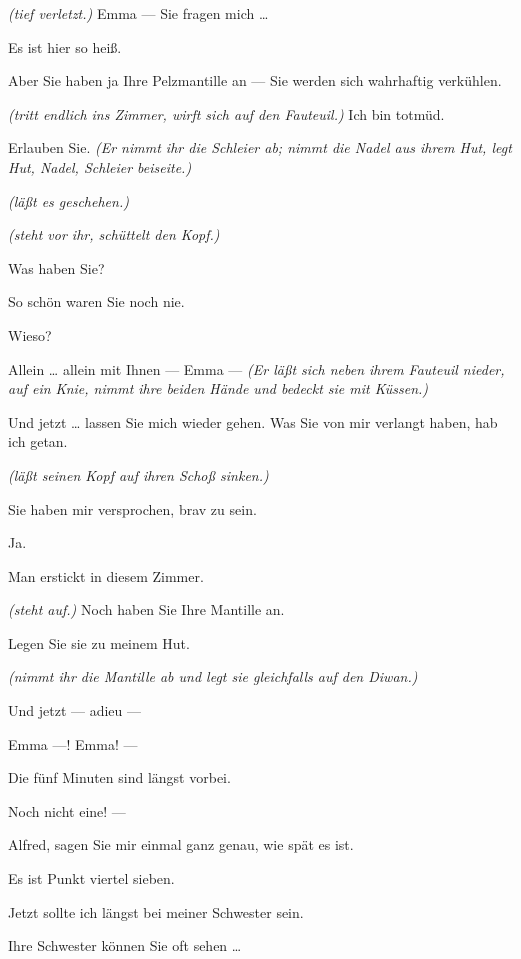 \documentclass[
	final,
	a4paper,
	ngerman,
	mpinclude = true, %
	twoside = true,
	open = right,
	cleardoublepage = plain,
	DIV = 13,
	BCOR = 1cm,
	titlepage = firstiscover,
	]{scrbook}
\newcommand{\direction}[1]{\textit{(#1)}}
\newcommand{\thecharacter}[1]{\textup{\textsc{#1}}\xspace}
\newcommand{\theherr}{\thecharacter{Junger Herr}}
\newcommand{\thefrau}{\thecharacter{Junge Frau}}
\newcommand{\character}[1]{\item[#1:]}
\newcommand{\herr}{\character{\theherr}}
\newcommand{\frau}{\character{\thefrau}}
\begin{document}
\begin{play}
	\herr
	\direction{tief verletzt.} Emma --- Sie fragen mich \ldots{}

	\frau
	Es ist hier so heiß.

	\herr
	Aber Sie haben ja Ihre Pelzmantille an --- Sie werden sich wahrhaftig verkühlen.

	\frau
	\direction{tritt endlich ins Zimmer, wirft sich auf den Fauteuil.} Ich bin totmüd.

	\herr
	Erlauben Sie. \direction{Er nimmt ihr die Schleier ab; nimmt die Nadel aus ihrem Hut, legt Hut, Nadel, Schleier beiseite.}

	\frau
	\direction{läßt es geschehen.}

	\herr
	\direction{steht vor ihr, schüttelt den Kopf.}

	\frau
	Was haben Sie?

	\herr
	So schön waren Sie noch nie.

	\frau
	Wieso?

	\herr
	Allein \ldots{} allein mit Ihnen --- Emma --- \direction{Er läßt sich neben ihrem Fauteuil nieder, auf ein Knie, nimmt ihre beiden Hände und bedeckt sie mit Küssen.}

	\frau
	Und jetzt \ldots{} lassen Sie mich wieder gehen. Was Sie von mir verlangt haben, hab ich getan.

	\herr
	\direction{läßt seinen Kopf auf ihren Schoß sinken.}

	\frau
	Sie haben mir versprochen, brav zu sein.

	\herr
	Ja.

	\frau
	Man erstickt in diesem Zimmer.

	\herr
	\direction{steht auf.} Noch haben Sie Ihre Mantille an.

	\frau
	Legen Sie sie zu meinem Hut.

	\herr
	\direction{nimmt ihr die Mantille ab und legt sie gleichfalls auf den Diwan.}

	\frau
	Und jetzt --- adieu ---

	\herr
	Emma ---! Emma! ---

	\frau
	Die fünf Minuten sind längst vorbei.

	\herr
	Noch nicht eine! ---

	\frau
	Alfred, sagen Sie mir einmal ganz genau, wie spät es ist.

	\herr
	Es ist Punkt viertel sieben.

	\frau
	Jetzt sollte ich längst bei meiner Schwester sein.

	\herr
	Ihre Schwester können Sie oft sehen \ldots{}


\end{play}
\end{document}
